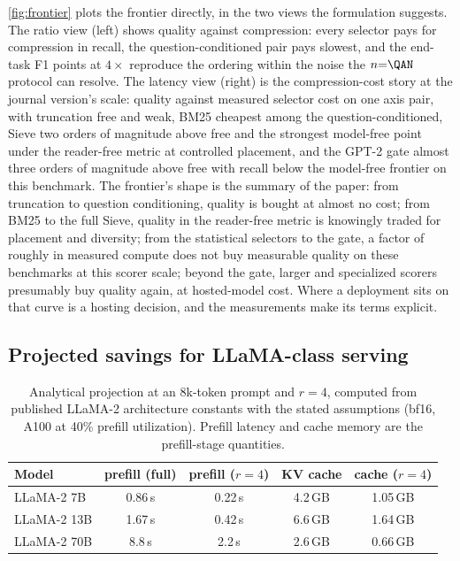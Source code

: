 \documentclass[review,12pt]{elsarticle}
\theoremstyle{remark}
\newcommand{\method}{Sieve}
\begin{document}
\autoref{fig:frontier} plots the frontier directly, in the two views
the formulation suggests. The ratio view (left) shows quality against
compression: every selector pays for compression in recall, the
question-conditioned pair pays slowest, and the end-task F1 points at
$4\times$ reproduce the ordering within the noise the $n{=}\QAN$
protocol can resolve. The latency view (right) is the
compression-cost story at the journal version's scale: quality against
measured selector cost on one axis pair, with truncation free and
weak, BM25 cheapest among the question-conditioned, \method{} two
orders of magnitude above free and the strongest model-free point
under the reader-free metric at controlled placement, and the GPT-2
gate almost three orders of magnitude above free with recall below
the model-free frontier on this benchmark. The frontier's shape is
the summary of the paper: from truncation to question conditioning,
quality is bought at almost no cost; from BM25 to the full
\method{}, quality in the reader-free metric is knowingly traded for
placement and diversity; from the statistical selectors to the gate,
a factor of roughly \GateSieRatioSixk{} in measured compute does not
buy measurable quality on these benchmarks at this scorer scale;
beyond the gate, larger and specialized scorers presumably buy
quality again, at hosted-model cost. Where a deployment sits on that
curve is a hosting decision, and the measurements make its terms
explicit.

\subsection{Projected savings for LLaMA-class serving}
\label{sec:projection}

\begin{table}[t]
\centering
\caption{Analytical projection at an 8k-token prompt and $r=4$,
computed from published LLaMA-2 architecture constants with the
stated assumptions (bf16, A100 at 40\% prefill utilization). Prefill
latency and cache memory are the prefill-stage quantities.}
\label{tab:projection}
\small
\begin{tabular}{lcccc}
\toprule
Model & prefill (full) & prefill ($r=4$) & KV cache & cache ($r=4$) \\
\midrule
LLaMA-2 7B & 0.86\,s & 0.22\,s & 4.2\,GB & 1.05\,GB \\
LLaMA-2 13B & 1.67\,s & 0.42\,s & 6.6\,GB & 1.64\,GB \\
LLaMA-2 70B & 8.8\,s & 2.2\,s & 2.6\,GB & 0.66\,GB \\
\bottomrule
\end{tabular}
\end{table}
\end{document}
